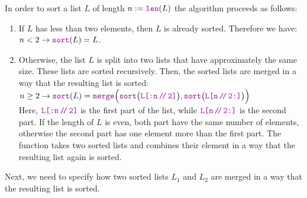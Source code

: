 In order to sort a list $L$ of length $n := \mytt{len}(L)$ the algorithm proceeds as follows:
\begin{enumerate}
\item If $L$ has less than two elements, then $L$ is already sorted.  Therefore we have: 
      \\[0.2cm]
      \hspace*{1.3cm}
      $n < 2 \rightarrow \mytt{sort}(L) = L$.
\item Otherwise, the list $L$ is split into two lists that have approximately the same size.
      These lists are sorted recursively.  Then, the sorted lists are merged in a way that the
      resulting list is sorted: \\[0.2cm]
      \hspace*{1.3cm} 
      $n \geq 2 \rightarrow \mytt{sort}(L) =
         \mytt{merge}\Bigl(\mytt{sort}\bigl(\mytt{L[:n\dv 2]}\bigr),
         \mytt{sort}\bigl(\mytt{L[n\dv 2:]}\bigr)\Bigr)
     $
      \\[0.2cm]
      Here,  $\mytt{L[:n\dv 2]}$ is the first part of the list, while
      $\mytt{L[n\dv 2:]}$ is the second part.  If the length of $L$ is even, both part have the same number of
      elements, otherwise the second part has one element more than the first part.  The function 
      takes two sorted lists and combines their element in a way that the resulting list again is sorted.
\end{enumerate}
Next, we need to specify how two sorted lists $L_1$ and $L_2$ are merged in a way that the resulting list
is sorted.
